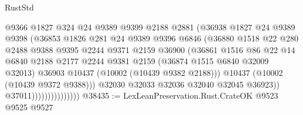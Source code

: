 \begin{lexlean}{RustStd}
\begin{coremodule}
                                  @9366
                                  @1827
                                  @324
                                  @24
                                  @9389
                                  @9399
                                  @2188
                                  @2881
                                  (@36938
                                    @1827
                                    @24
                                    @9389
                                    @9398
                                    (@36853
                                      @1826
                                      @281
                                      @24
                                      @9389
                                      @9396
                                      @6846
                                      (@36880
                                        @1518
                                        @22
                                        @280
                                        @2488
                                        @9388
                                        @9395
                                        @2244
                                        @9371
                                        @2159
                                        @36900
                                        (@36861
                                          @1516
                                          @86
                                          @22
                                          @14
                                          @6840
                                          @2188
                                          @2177
                                          @2244
                                          @9381
                                          @2159
                                          (@36874 @1515 @6840 @32009 @32013)
                                          @36903
                                          @10437
                                          (@10002 (@10439 @9382 @2188)))
                                        @10437
                                        (@10002 (@10439 @9372 @9388)))
                                      @32030
                                      @32033
                                      @32036
                                      @32040
                                      @32045
                                      @36923))
                                  @37011)))))))))))))))
@38435 := LexLeanPreservation.Rust.CrateOK @9523 @9525 @9527

\end{coremodule}
\end{lexlean}
